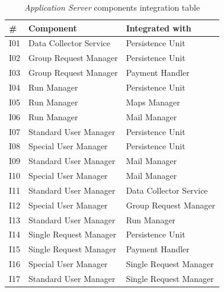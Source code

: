 \begin{center}
\begin{table}[H]
\begin{tabular}{ | l | p{} | p{} |}
  \hline
    \textbf{\#} & \textbf{Component} & \textbf{Integrated with} \\ \hline
    I01  & Data Collector Service  & Persistence Unit \\ \hline
    I02  & Group Request Manager  & Persistence Unit \\ \hline
    I03  & Group Request Manager  & Payment Handler \\ \hline
    I04  & Run Manager & Persistence Unit \\ \hline
    I05  & Run Manager & Maps Manager \\ \hline
    I06  & Run Manager & Mail Manager \\ \hline
    I07  & Standard User Manager & Persistence Unit \\ \hline
    I08  & Special User Manager & Persistence Unit \\ \hline
    I09  & Standard User Manager & Mail Manager \\ \hline
    I10  & Special User Manager & Mail Manager \\ \hline
    I11  & Standard User Manager & Data Collector Service \\ \hline
    I12  & Special User Manager & Group Request Manager \\ \hline
    I13  & Standard User Manager & Run Manager \\ \hline
    I14  & Single Request Manager & Persistence Unit \\ \hline
    I15  & Single Request Manager & Payment Handler \\ \hline
    I16  & Special User Manager & Single Request Manager \\ \hline
    I17  & Standard User Manager & Single Request Manager \\ \hline
\end{tabular}
\caption{\textit{Application Server} components integration table}
\label{table:appServerIntegrationTable}
\end{table}
\end{center}


